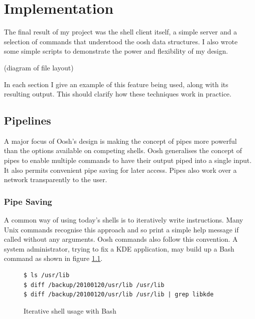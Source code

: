 \documentclass[12pt,twoside,notitlepage]{report}
\begin{document}

\cleardoublepage

\chapter{Implementation}

The final result of my project was the shell client itself, a simple server and
a selection of commands that understood the oosh data structures. I also wrote
some simple scripts to demonstrate the power and flexibility of my design.

(diagram of file layout)

In each section I give an example of this feature being used, along
with its resulting output. This should clarify how these techniques
work in practice.

\section{Pipelines}
A major focus of Oosh's design is making the concept of pipes more powerful than
the options available on competing shells. Oosh generalises the concept of pipes
to enable multiple commands to have their output piped into a single input. It
also permits convenient pipe saving for later access. Pipes also work over a
network transparently to the user.

\subsection{Pipe Saving}
A common way of using today's shells is to iteratively write
instructions. Many Unix commands recognise this approach and so print
a simple help message if called without any arguments. Oosh commands
also follow this convention. A system
administrator, trying to fix a KDE application, may build up a Bash
command as shown in figure \ref{bashiter}.

\begin{figure}[h]
\label{bashiter}
\caption{Iterative shell usage with Bash}
\begin{verbatim}
$ ls /usr/lib
$ diff /backup/20100120/usr/lib /usr/lib
$ diff /backup/20100120/usr/lib /usr/lib | grep libkde
\end{verbatim}
\end{figure}
\end{document}
